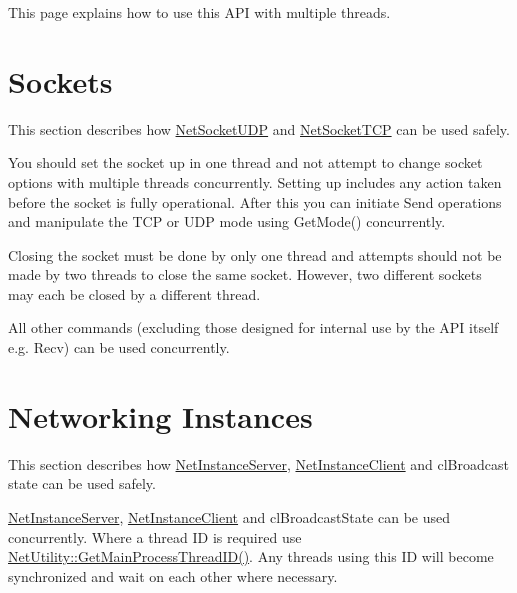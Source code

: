 This page explains how to use this API with multiple threads.\par
\par
\hypertarget{multithreading_page_mtSockets}{}\section{Sockets}\label{multithreading_page_mtSockets}
This section describes how \hyperlink{class_net_socket_u_d_p}{NetSocketUDP} and \hyperlink{class_net_socket_t_c_p}{NetSocketTCP} can be used safely.\par
\par


You should set the socket up in one thread and not attempt to change socket options with multiple threads concurrently. Setting up includes any action taken before the socket is fully operational. After this you can initiate Send operations and manipulate the TCP or UDP mode using GetMode() concurrently. \par
\par


Closing the socket must be done by only one thread and attempts should not be made by two threads to close the same socket. However, two different sockets may each be closed by a different thread. \par
\par


All other commands (excluding those designed for internal use by the API itself e.g. Recv) can be used concurrently.\par
\par
\hypertarget{multithreading_page_mtNetInstances}{}\section{Networking Instances}\label{multithreading_page_mtNetInstances}
This section describes how \hyperlink{class_net_instance_server}{NetInstanceServer}, \hyperlink{class_net_instance_client}{NetInstanceClient} and clBroadcast state can be used safely.\par
\par


\hyperlink{class_net_instance_server}{NetInstanceServer}, \hyperlink{class_net_instance_client}{NetInstanceClient} and clBroadcastState can be used concurrently. Where a thread ID is required use \hyperlink{class_net_utility_aca0bbea45a7bc232fdb88505f97cc016}{NetUtility::GetMainProcessThreadID()}. Any threads using this ID will become synchronized and wait on each other where necessary.

